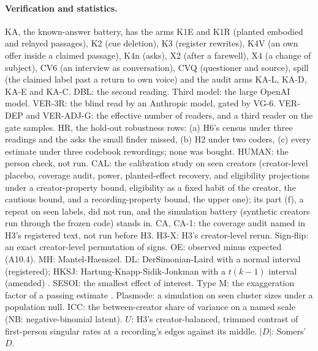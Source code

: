 \paragraph{Verification and statistics.} KA, the known-answer battery, has the arms K1E and K1R (planted embodied and
relayed passages), K2 (cue deletion), K3 (register rewrites), K4V (an own offer inside a claimed passage), K4n (asks), X2
(after a farewell), X4 (a change of subject), CV6 (an interview as conversation), CVQ (questioner and source), spill
(the claimed label past a return to own voice) and the audit arms KA-L, KA-D, KA-E and KA-C. DBL: the second reading.
Third model: the large OpenAI model. VER-3R: the blind read by an Anthropic model, gated by VG-6. VER-DEP and VER-ADJ-G:
the effective number of readers, and a third reader on the gate samples. HR, the hold-out robustness rows: (a) H6's
census under three readings and the asks the small finder missed, (b) H2 under two coders, (c) every estimate under
three codebook rewordings; none was bought. HUMAN: the person check, not run. CAL: the calibration study on seen
creators (creator-level placebo, coverage audit, power, planted-effect recovery, and eligibility projections under a
creator-property bound, eligibility as a fixed habit of the creator, the cautious bound, and a recording-property
bound, the upper one); its part (f), a repeat on seen labels, did not run, and the simulation battery (synthetic
creators run through the frozen code) stands in. CA, CA-1: the coverage audit named in H3's registered text, not run
before H3. H3-X: H3's creator-level rerun. Sign-flip: an exact creator-level permutation of signs. OE: observed minus
expected (A10.4). MH: Mantel-Haenszel. DL: DerSimonian-Laird with a normal interval (registered); HKSJ:
Hartung-Knapp-Sidik-Jonkman with a $t(k-1)$ interval (amended) \cite{inthout2014hartung}. SESOI: the smallest effect of
interest. Type M: the exaggeration factor of a passing estimate \cite{gelman2014beyond}. Plasmode: a simulation on seen
cluster sizes under a population null. ICC: the between-creator share of variance on a named scale (NB:
negative-binomial latent). $U$: H3's creator-balanced, trimmed contrast of first-person singular rates at a recording's
edges against its middle. $|D|$: Somers' $D$.

